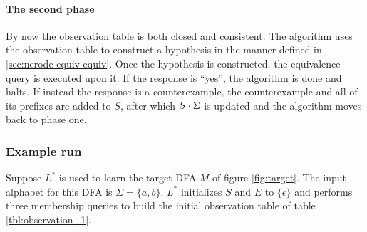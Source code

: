 \paragraph{The second phase} By now the observation table is both closed and
consistent. The algorithm uses the observation table to construct a hypothesis
in the manner defined in \cref{sec:nerode-equiv-equiv}. Once the hypothesis is
constructed, the equivalence query is executed upon it. If the response is
``yes'', the algorithm is done and halts. If instead the response is a
counterexample, the counterexample and all of its prefixes are added to $S$,
after which $S \cdot \Sigma$ is updated and the algorithm moves back to phase
one.

\subsubsection{Example run}
\label{sec:example-run}
Suppose $L^*$ is used to learn the target DFA $M$ of figure \ref{fig:target}.
The input alphabet for this DFA is $\Sigma = \{a, b\}$. $L^*$ initializes $S$
and $E$ to $\{\epsilon\}$ and performs three membership queries to build the
initial observation table of table \ref{tbl:observation_1}.

